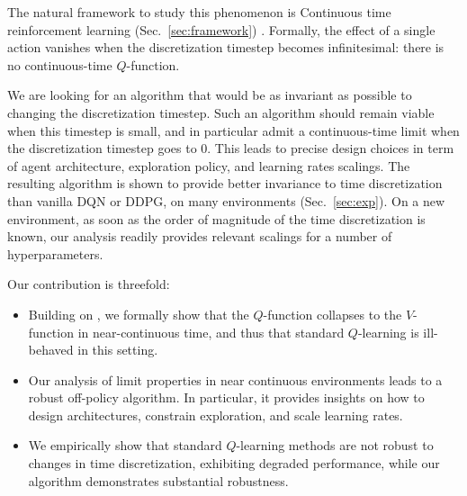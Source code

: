 The natural framework to study this phenomenon is Continuous time
reinforcement learning (Sec.~\ref{sec:framework}) \cite{cont_rl,
adv_upd}. Formally, the effect of a single action vanishes when the
discretization timestep becomes infinitesimal: there is no
continuous-time $Q$-function. 

We are looking for an algorithm that would be as invariant as possible to
changing the discretization timestep. Such an 
algorithm should remain viable when this timestep is small, and in particular admit a
continuous-time
limit when the discretization timestep goes to $0$.  This
leads to precise design choices in term of agent architecture, exploration
policy, and learning rates scalings.  The resulting algorithm is shown to
provide better invariance to time discretization than
vanilla DQN or DDPG, on many environments (Sec.~\ref{sec:exp}).  On a new environment, as soon as the
order of magnitude of the time discretization is known, our analysis readily
provides relevant scalings for a number of hyperparameters.


Our contribution is threefold:
\begin{itemize} 
\item Building on \cite{adv_upd}, we formally show that the $Q$-function collapses to the $V$-function in near-continuous time, and thus that
    standard $Q$-learning is ill-behaved in this setting.
  \item Our analysis of limit properties in near continuous environments leads to a robust off-policy algorithm. In particular,
    it provides insights on how to design architectures, constrain exploration, and scale learning rates.
  \item We empirically show that standard $Q$-learning methods are not
  robust to changes in time discretization, exhibiting degraded
  performance, while our algorithm demonstrates
  substantial robustness.
\end{itemize}


